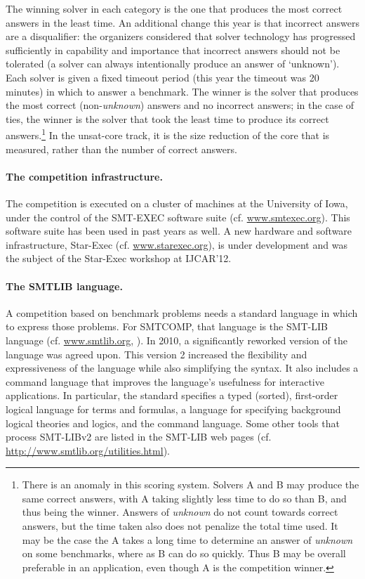 \documentclass{llncs}
\begin{document}
The winning solver in each category is the one that produces the most correct answers in the least time. An additional change this year is that incorrect answers are a disqualifier: the organizers considered that solver technology has progressed sufficiently in capability and importance that incorrect answers should not be tolerated (a solver can always intentionally produce an answer of `unknown'). Each solver is given a fixed timeout period (this year the timeout was 20 minutes) in which to answer a benchmark. The winner is the solver that produces the most correct (non-{\em unknown}) answers and no incorrect answers; in the case of ties, the winner is the solver that took the least time to produce its correct answers.\footnote{There is an anomaly in this scoring system. Solvers A and B may produce the same correct answers, with A taking slightly less time to do so than B, and thus being the winner. Answers of {\em unknown} do not count towards correct answers, but the time taken also does not penalize the total time used. It may be the case the A takes a long time to determine an answer of {\em unknown} on some benchmarks, where as B can do so quickly. Thus B may be overall preferable in an application, even though A is the competition winner.}
In the unsat-core track, it is the size reduction of the core that is measured, rather than the number of correct answers.

\paragraph{The competition infrastructure.} The competition is executed on a cluster of machines at the University of Iowa, under the control of the SMT-EXEC software suite (cf. \url{www.smtexec.org}). This software suite has been used in past years as well. A new hardware and software infrastructure, Star-Exec (cf. \url{www.starexec.org}), is under development and was the subject of the Star-Exec workshop at IJCAR'12.

\paragraph{The SMTLIB language.} A competition based on benchmark problems needs a standard language in which to express those problems.
For SMTCOMP, that language is the SMT-LIB language (cf. \url{www.smtlib.org}, \cite{BarST-SMT-10} \cite{Cok-SMTLIBTutorial-2011}). 
In 2010, a significantly reworked version of the language was agreed upon.
This version 2 increased the flexibility and expressiveness of the language while also simplifying the syntax. 
It also includes a command language that improves the language's usefulness for interactive applications.
In particular, the standard specifies a typed (sorted), first-order logical language for terms and formulas, a language for specifying background logical theories and logics, and the command language. Some other tools that process SMT-LIBv2 are listed in the SMT-LIB web pages (cf. \url{http://www.smtlib.org/utilities.html}).
\end{document}
